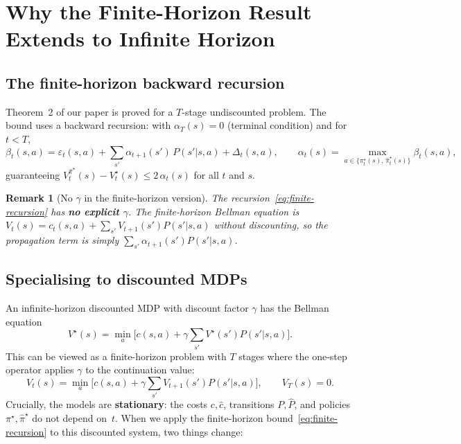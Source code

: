 \documentclass[11pt]{article}
\newcommand{\pistar}{\pi^\star}
\newcommand{\pihatstar}{\hat\pi^\star}
\newcommand{\Vstar}{V^\star}
\newcommand{\Vpihat}{V^{\pihatstar}}
\newtheorem{remark}{Remark}
\begin{document}
\section{Why the Finite-Horizon Result Extends to Infinite Horizon}

\subsection{The finite-horizon backward recursion}

Theorem~2 of our paper is proved for a $T$-stage undiscounted problem.  The
bound uses a backward recursion: with $\alpha_T(s) = 0$ (terminal condition)
and for $t < T$,
\begin{equation}\label{eq:finite-recursion}
  \beta_t(s,a) = \varepsilon_t(s,a) + \sum_{s'} \alpha_{t+1}(s')\, P(s'|s,a) + \Delta_t(s,a),
  \qquad
  \alpha_t(s) = \max_{a \in \{\pistar_t(s),\, \pihatstar_t(s)\}} \beta_t(s,a),
\end{equation}
guaranteeing $\Vpihat_t(s) - \Vstar_t(s) \le 2\,\alpha_t(s)$ for all $t$ and $s$.

\begin{remark}[No $\gamma$ in the finite-horizon version]
The recursion~\eqref{eq:finite-recursion} has \textbf{no explicit $\gamma$}.
The finite-horizon Bellman equation is $V_t(s) = c_t(s,a) + \sum_{s'} V_{t+1}(s')P(s'|s,a)$
without discounting, so the propagation term is simply $\sum_{s'} \alpha_{t+1}(s')P(s'|s,a)$.
\end{remark}

\subsection{Specialising to discounted MDPs}

An infinite-horizon discounted MDP with discount factor $\gamma$ has the
Bellman equation
\[
  \Vstar(s) = \min_a \bigl[c(s,a) + \gamma \textstyle\sum_{s'} \Vstar(s') P(s'|s,a)\bigr].
\]
This can be viewed as a finite-horizon problem with $T$ stages where the
one-step operator applies $\gamma$ to the continuation value:
\begin{equation}\label{eq:bellman-T}
  V_t(s) = \min_a \bigl[c(s,a) + \gamma \textstyle\sum_{s'} V_{t+1}(s') P(s'|s,a)\bigr],
  \qquad V_T(s) = 0.
\end{equation}
Crucially, the models are \textbf{stationary}: the costs $c, \hat c$, transitions
$P, \hat P$, and policies $\pistar, \pihatstar$ do not depend on~$t$.  When
we apply the finite-horizon bound~\eqref{eq:finite-recursion} to this
discounted system, two things change:
\end{document}
